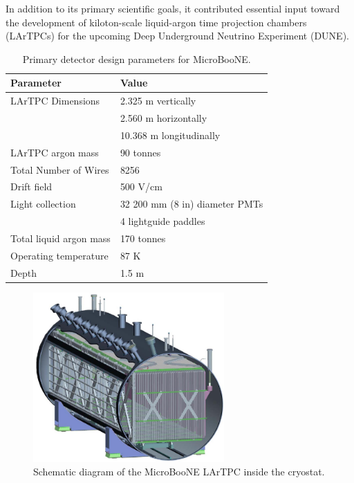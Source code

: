 \documentclass{pracalicmgr}
\begin{document}
In addition to its primary scientific goals, it contributed essential input toward the development of kiloton-scale liquid-argon time projection chambers (LArTPCs) for the upcoming Deep Underground Neutrino Experiment (DUNE).


\begin{table}[H]
\centering
\caption{Primary detector design parameters for MicroBooNE.}
\begin{tabular}{|l|l|}
\hline
\textbf{Parameter} & \textbf{Value} \\
\hline
LArTPC Dimensions & 2.325 m vertically \\
                  & 2.560 m horizontally \\
                  & 10.368 m longitudinally \\
\hline
LArTPC argon mass & 90 tonnes \\
\hline
Total Number of Wires & 8256 \\
\hline
Drift field & 500 V/cm \\
\hline
Light collection & 32 200 mm (8 in) diameter PMTs \\
                 & 4 lightguide paddles \\
\hline
Total liquid argon mass & 170 tonnes \\
\hline
Operating temperature & 87 K \\
\hline
Depth & 1.5 m \\
\hline
\end{tabular}
\label{tab:microboone_specs}
\end{table}

\begin{figure}[H]
    \centering
    \includegraphics[width=0.65\textwidth]{src/microBooNe_Layout.pdf}
    \caption{Schematic diagram of the MicroBooNE LArTPC inside the cryostat.}
    \label{fig:microboone_layout}
\end{figure}
\end{document}
